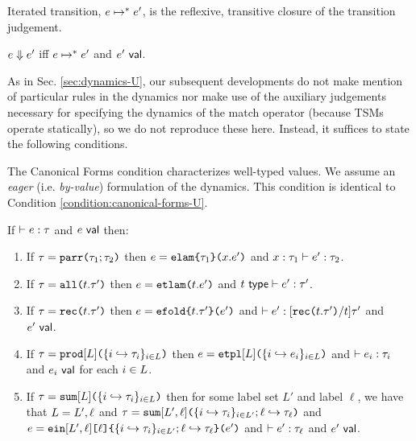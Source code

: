 {{{{\begin{definition}\label{defn:iterated-transition-UP} Iterated transition, $e \mapsto^{*} e'$, is the reflexive, transitive closure of the transition judgement.\end{definition}

\begin{definition}[Evaluation]\label{defn:evaluation-UP}  $e \Downarrow e'$ iff $e \mapsto^{*} e'$ and $e'~\mathsf{val}$. \end{definition}

As in Sec. \ref{sec:dynamics-U}, our subsequent developments do not make mention of particular rules in the dynamics nor make use of the auxiliary judgements necessary for specifying the dynamics of the match operator (because TSMs operate statically), so we do not reproduce these here. Instead, it suffices to state the following conditions.

The Canonical Forms condition characterizes well-typed values. We assume an \emph{eager} (i.e. \emph{by-value}) formulation of the dynamics. This condition is identical to Condition \ref{condition:canonical-forms-U}.

\begin{condition}\label{condition:canonical-forms-UP} If $\vdash e : \tau$ and $e~\mathsf{val}$ then:
\begin{enumerate}
\item If $\tau=\texttt{parr}\texttt{(}\tau_1; \tau_2\texttt{)}$ then $e=\texttt{elam}\texttt{\{}\tau_1\texttt{\}(}x.e'\texttt{)}$ and $x : \tau_1 \vdash e' : \tau_2$.
\item If $\tau=\texttt{all}\texttt{(}t.\tau'\texttt{)}$ then $e=\texttt{etlam}\texttt{(}t.e'\texttt{)}$ and $t~\mathsf{type} \vdash e' : \tau'$.
\item If $\tau=\texttt{rec}\texttt{(}t.\tau'\texttt{)}$ then $e=\texttt{efold}\texttt{\{}t.\tau'\texttt{\}(}e'\texttt{)}$ and $\vdash e' : [\texttt{rec}\texttt{(}t.\tau'\texttt{)}/t]\tau'$ and $e'~\mathsf{val}$. 
\item If $\tau=\texttt{prod}[L]\texttt{(}\{i \hookrightarrow \tau_{i}\}_{i \in L}\texttt{)}$ then $e=\texttt{etpl}[L]\texttt{(}\{i \hookrightarrow e_{i}\}_{i \in L}\texttt{)}$ and $\vdash e_i : \tau_i$ and $e_i~\mathsf{val}$ for each $i \in L$.
\item If $\tau=\texttt{sum}[L]\texttt{(}\{i \hookrightarrow \tau_{i}\}_{i \in L}\texttt{)}$ then for some label set $L'$ and label $\ell$, we have that $L=L', \ell$ and $\tau=\texttt{sum}[L', \ell]\texttt{(}\{i \hookrightarrow \tau_{i}\}_{i \in L'}; \ell \hookrightarrow \tau_\ell\texttt{)}$ and $e=\texttt{ein}[L', \ell]\texttt{[}\ell\texttt{]\{}\{i \hookrightarrow \tau_{i}\}_{i \in L'}; \ell \hookrightarrow \tau_\ell\texttt{\}(}e'\texttt{)}$ and $\vdash e' : \tau_\ell$ and $e'~\mathsf{val}$.\end{enumerate}\end{condition}

}}}}
